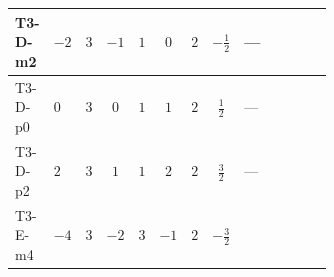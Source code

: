 \documentclass[8pt]{article}
\begin{document}
\begin{landscape}
\begin{longtable}{@{}llcccccc >{\raggedright\arraybackslash}p{0.21\linewidth} >{\raggedright\arraybackslash}p{0.21\linewidth} >{\raggedright\arraybackslash}p{0.21\linewidth}@{}}
\midrule
T3-D-m2 & $-2$ & $3$ & $-1$ & $1$ & $0$ & $2$ & $-\frac{1}{2}$ & --- & \scriptsize\adjustbox{max width=\linewidth}{$\begin{gathered} -4 \operatorname{Tr}\!\left({y_2}\,\left({y_2}\right)^{\dagger}\,{Y_e}\,\left({Y_e}\right)^{\dagger}\right)\end{gathered}$} & \scriptsize\adjustbox{max width=\linewidth}{$\begin{gathered} +12 {\lambda_5} \left({\lambda_5}\right)^{*}\end{gathered}$} \\
\midrule
T3-D-p0 & $0$ & $3$ & $0$ & $1$ & $1$ & $2$ & $\frac{1}{2}$ & --- & \scriptsize\adjustbox{max width=\linewidth}{$\begin{gathered} -4 \operatorname{Tr}\!\left({y_2}\,\left({y_2}\right)^{\dagger}\,{Y_e}\,\left({Y_e}\right)^{\dagger}\right)\end{gathered}$} & \scriptsize\adjustbox{max width=\linewidth}{$\begin{gathered} +12 {\lambda_5} \left({\lambda_5}\right)^{*}\end{gathered}$} \\
\midrule
T3-D-p2 & $2$ & $3$ & $1$ & $1$ & $2$ & $2$ & $\frac{3}{2}$ & --- & \scriptsize\adjustbox{max width=\linewidth}{$\begin{gathered} -4 \operatorname{Tr}\!\left({y_2}\,\left({y_2}\right)^{\dagger}\,{Y_e}\,\left({Y_e}\right)^{\dagger}\right)\end{gathered}$} & \scriptsize\adjustbox{max width=\linewidth}{$\begin{gathered} +12 {\lambda_5} \left({\lambda_5}\right)^{*}\end{gathered}$} \\
\midrule
T3-E-m4 & $-4$ & $3$ & $-2$ & $3$ & $-1$ & $2$ & $-\frac{3}{2}$ & \scriptsize\adjustbox{max width=\linewidth}{$\begin{gathered} {\lambda_{HS_2}^{(1)}} (2 T_{\nu}^{(2)}+6 \operatorname{Tr}\!\left({Y_d}\,\left({Y_d}\right)^{\dagger}\right)+2 \operatorname{Tr}\!\left({Y_e}\,\left({Y_e}\right)^{\dagger}\right)+6 \operatorname{Tr}\!\left({Y_u}\,\left({Y_u}\right)^{\dagger}\right)+4 {\lambda_{S_2}^{(A)}})\end{gathered}$} & \scriptsize\adjustbox{max width=\linewidth}{$\begin{gathered} -2 \operatorname{Tr}\!\left({y_2}\,\left({y_2}\right)^{\dagger}\,{Y_e}\,\left({Y_e}\right)^{\dagger}\right)\end{gathered}$} & \scriptsize\adjustbox{max width=\linewidth}{$\begin{gathered} +4 {\lambda_5} \left({\lambda_5}\right)^{*}\end{gathered}$} \\

\end{longtable}
\end{landscape}
\end{document}
